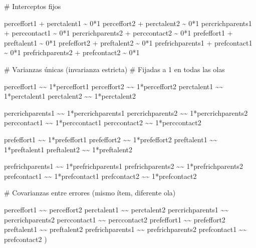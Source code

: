 \documentclass[
  12pt,
]{article}
\newenvironment{Shaded}{\begin{snugshade}}{\end{snugshade}}
\newcommand{\NormalTok}[1]{\textcolor[rgb]{0.00,0.23,0.31}{#1}}
\newcommand{\StringTok}[1]{\textcolor[rgb]{0.13,0.47,0.30}{#1}}
\begin{document}
\begin{Shaded}
\begin{Highlighting}[]
\StringTok{\# Interceptos fijos}

\StringTok{perceffort1 + perctalent1 \textasciitilde{} 0*1}
\StringTok{perceffort2 + perctalent2 \textasciitilde{} 0*1}
\StringTok{percrichparents1 + perccontact1 \textasciitilde{} 0*1}
\StringTok{percrichparents2 + perccontact2 \textasciitilde{} 0*1}
\StringTok{prefeffort1 + preftalent1 \textasciitilde{} 0*1}
\StringTok{prefeffort2 + preftalent2 \textasciitilde{} 0*1}
\StringTok{prefrichparents1 + prefcontact1 \textasciitilde{} 0*1}
\StringTok{prefrichparents2 + prefcontact2 \textasciitilde{} 0*1}


\StringTok{\# Varianzas únicas (invarianza estricta)}
\StringTok{\# Fijadas a 1 en todas las olas}

\StringTok{perceffort1 \textasciitilde{}\textasciitilde{} 1*perceffort1}
\StringTok{perceffort2 \textasciitilde{}\textasciitilde{} 1*perceffort2}
\StringTok{perctalent1 \textasciitilde{}\textasciitilde{} 1*perctalent1}
\StringTok{perctalent2 \textasciitilde{}\textasciitilde{} 1*perctalent2}

\StringTok{percrichparents1 \textasciitilde{}\textasciitilde{} 1*percrichparents1}
\StringTok{percrichparents2 \textasciitilde{}\textasciitilde{} 1*percrichparents2}
\StringTok{perccontact1 \textasciitilde{}\textasciitilde{} 1*perccontact1}
\StringTok{perccontact2 \textasciitilde{}\textasciitilde{} 1*perccontact2}

\StringTok{prefeffort1 \textasciitilde{}\textasciitilde{} 1*prefeffort1}
\StringTok{prefeffort2 \textasciitilde{}\textasciitilde{} 1*prefeffort2}
\StringTok{preftalent1 \textasciitilde{}\textasciitilde{} 1*preftalent1}
\StringTok{preftalent2 \textasciitilde{}\textasciitilde{} 1*preftalent2}

\StringTok{prefrichparents1 \textasciitilde{}\textasciitilde{} 1*prefrichparents1}
\StringTok{prefrichparents2 \textasciitilde{}\textasciitilde{} 1*prefrichparents2}
\StringTok{prefcontact1 \textasciitilde{}\textasciitilde{} 1*prefcontact1}
\StringTok{prefcontact2 \textasciitilde{}\textasciitilde{} 1*prefcontact2}


\StringTok{\# Covarianzas entre errores (mismo ítem, diferente ola)}

\StringTok{perceffort1 \textasciitilde{}\textasciitilde{} perceffort2}
\StringTok{perctalent1 \textasciitilde{}\textasciitilde{} perctalent2}
\StringTok{percrichparents1 \textasciitilde{}\textasciitilde{} percrichparents2}
\StringTok{perccontact1 \textasciitilde{}\textasciitilde{} perccontact2}
\StringTok{prefeffort1 \textasciitilde{}\textasciitilde{} prefeffort2}
\StringTok{preftalent1 \textasciitilde{}\textasciitilde{} preftalent2}
\StringTok{prefrichparents1 \textasciitilde{}\textasciitilde{} prefrichparents2}
\StringTok{prefcontact1 \textasciitilde{}\textasciitilde{} prefcontact2}
\StringTok{\textquotesingle{}}\NormalTok{)}


\end{Highlighting}
\end{Shaded}
\end{document}
